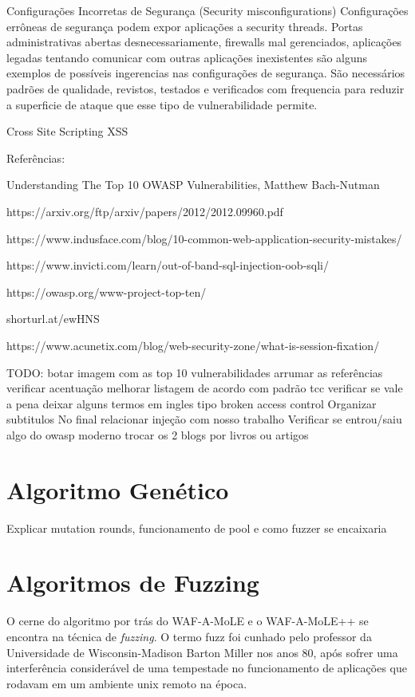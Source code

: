 Configurações Incorretas de Segurança (Security misconfigurations)
Configurações errôneas de segurança podem expor aplicações a security threads. Portas administrativas abertas desnecessariamente, firewalls mal gerenciados, aplicações legadas tentando comunicar com outras aplicações inexistentes são alguns exemplos de possíveis ingerencias nas configurações de segurança. São necessários padrões de qualidade, revistos, testados e verificados com frequencia para reduzir a superficie de ataque que esse tipo de vulnerabilidade permite.

Cross Site Scripting XSS

Referências:

Understanding The Top 10 OWASP Vulnerabilities, Matthew Bach-Nutman

https://arxiv.org/ftp/arxiv/papers/2012/2012.09960.pdf

https://www.indusface.com/blog/10-common-web-application-security-mistakes/

https://www.invicti.com/learn/out-of-band-sql-injection-oob-sqli/

https://owasp.org/www-project-top-ten/

shorturl.at/ewHNS

https://www.acunetix.com/blog/web-security-zone/what-is-session-fixation/

TODO:
botar imagem com as top 10 vulnerabilidades
arrumar as referências
verificar acentuação
melhorar listagem de acordo com padrão tcc
verificar se vale a pena deixar alguns termos em ingles tipo broken access control
Organizar subtitulos
No final relacionar injeção com nosso trabalho
Verificar se entrou/saiu algo do owasp moderno
trocar os 2 blogs por livros ou artigos



\section{Algoritmo Genético}

Explicar mutation rounds, funcionamento de pool e como fuzzer se encaixaria

\section{Algoritmos de Fuzzing}

O cerne do algoritmo por trás do WAF-A-MoLE e o WAF-A-MoLE++ se encontra na técnica de \textit{fuzzing}. O termo fuzz foi cunhado pelo professor da Universidade de Wisconsin-Madison Barton Miller nos anos 80, após sofrer uma interferência considerável de uma tempestade no funcionamento de aplicações que rodavam em um ambiente unix remoto na época. 

